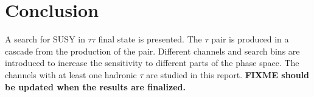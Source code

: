 \section{Conclusion}
\label{sect:conclusion}
A search for SUSY in $\tau\tau$ final state is presented. The $\tau$ pair is produced in a cascade from the production of the \PSGcpDo pair.
Different channels and search bins are introduced to increase the sensitivity to different parts of the phase space. 
The channels with at least one hadronic $\tau$ are studied in this report. 
{\bf FIXME should be updated when the results are finalized.}
